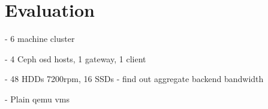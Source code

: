\section{Evaluation}

- 6 machine cluster

- 4 Ceph osd hosts, 1 gateway, 1 client

- 48 HDDs 7200rpm, 16 SSDs - find out aggregate backend bandwidth

- Plain qemu vms
